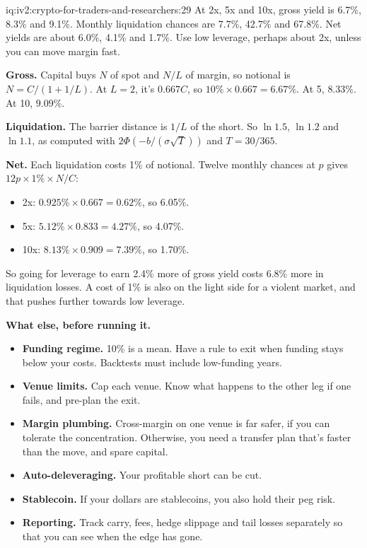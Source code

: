 \begin{solution}{iq:iv2:crypto-for-traders-and-researchers:29}
At 2x, 5x and 10x, gross yield is 6.7\%, 8.3\% and 9.1\%. Monthly liquidation chances are 7.7\%, 42.7\% and 67.8\%. Net yields are about 6.0\%, 4.1\% and 1.7\%. Use low leverage, perhaps about 2x, unless you can move margin fast.

\textbf{Gross.} Capital buys $N$ of spot and $N/L$ of margin, so notional is $N = C/(1 + 1/L)$. At $L = 2$, it's $0.667C$, so $10\% \times 0.667 = 6.67\%$. At 5, $8.33\%$. At 10, $9.09\%$.

\textbf{Liquidation.} The barrier distance is $1/L$ of the short. So $\ln 1.5$, $\ln 1.2$ and $\ln 1.1$, as computed with $2\Phi(-b/(\sigma\sqrt{T}))$ and $T = 30/365$.

\textbf{Net.} Each liquidation costs 1\% of notional. Twelve monthly chances at $p$ gives $12p \times 1\% \times N/C$:
\begin{itemize}
\item 2x: $0.925\% \times 0.667 = 0.62\%$, so 6.05\%.
\item 5x: $5.12\% \times 0.833 = 4.27\%$, so 4.07\%.
\item 10x: $8.13\% \times 0.909 = 7.39\%$, so 1.70\%.
\end{itemize}
So going for leverage to earn 2.4\% more of gross yield costs 6.8\% more in liquidation losses. A cost of 1\% is also on the light side for a violent market, and that pushes further towards low leverage.

\textbf{What else, before running it.}
\begin{itemize}
\item \textbf{Funding regime.} 10\% is a mean. Have a rule to exit when funding stays below your costs. Backtests must include low-funding years.
\item \textbf{Venue limits.} Cap each venue. Know what happens to the other leg if one fails, and pre-plan the exit.
\item \textbf{Margin plumbing.} Cross-margin on one venue is far safer, if you can tolerate the concentration. Otherwise, you need a transfer plan that's faster than the move, and spare capital.
\item \textbf{Auto-deleveraging.} Your profitable short can be cut.
\item \textbf{Stablecoin.} If your dollars are stablecoins, you also hold their peg risk.
\item \textbf{Reporting.} Track carry, fees, hedge slippage and tail losses separately so that you can see when the edge has gone.
\end{itemize}

\end{solution}

